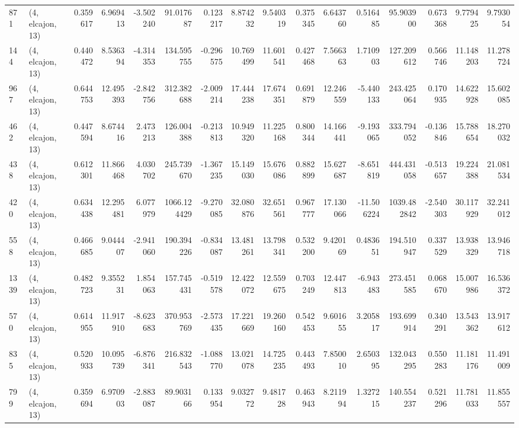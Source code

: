 \begin{tabular}{llrrrrrrrrrrrrrr}
871  &  (4, elcajon, 13) &   0.359617 &   6.969413 &  -3.502240 &     91.017687 &    0.123217 &    8.874232 &    9.540319 &  0.375345 &   6.643760 &   0.516485 &    95.903900 &   0.673368 &   9.779425 &   9.793054 \\
144  &  (4, elcajon, 13) &   0.440472 &   8.536394 &  -4.314353 &    134.595755 &   -0.296575 &   10.769499 &   11.601541 &  0.427468 &   7.566363 &   1.710903 &   127.209612 &   0.566746 &  11.148203 &  11.278724 \\
967  &  (4, elcajon, 13) &   0.644753 &  12.495393 &  -2.842756 &    312.382688 &   -2.009214 &   17.444238 &   17.674351 &  0.691879 &  12.246559 &  -5.440133 &   243.425064 &   0.170935 &  14.622928 &  15.602085 \\
462  &  (4, elcajon, 13) &   0.447594 &   8.674416 &   2.473213 &    126.004388 &   -0.213813 &   10.949320 &   11.225168 &  0.800344 &  14.166441 &  -9.193065 &   333.794052 &  -0.136846 &  15.788654 &  18.270032 \\
438  &  (4, elcajon, 13) &   0.612301 &  11.866468 &   4.030702 &    245.739670 &   -1.367235 &   15.149030 &   15.676086 &  0.882899 &  15.627687 &  -8.651819 &   444.431058 &  -0.513657 &  19.224388 &  21.081534 \\
420  &  (4, elcajon, 13) &   0.634438 &  12.295481 &   6.077979 &   1066.124429 &   -9.270085 &   32.080876 &   32.651561 &  0.967777 &  17.130066 & -11.506224 &  1039.482842 &  -2.540303 &  30.117929 &  32.241012 \\
558  &  (4, elcajon, 13) &   0.466685 &   9.044407 &  -2.941060 &    190.394226 &   -0.834087 &   13.481261 &   13.798341 &  0.532200 &   9.420169 &   0.483651 &   194.510947 &   0.337529 &  13.938329 &  13.946718 \\
1339 &  (4, elcajon, 13) &   0.482723 &   9.355231 &   1.854063 &    157.745431 &   -0.519578 &   12.422072 &   12.559675 &  0.703249 &  12.447813 &  -6.943483 &   273.451585 &   0.068670 &  15.007986 &  16.536372 \\
570  &  (4, elcajon, 13) &   0.614955 &  11.917910 &  -8.623683 &    370.953769 &   -2.573435 &   17.221669 &   19.260160 &  0.542453 &   9.601655 &   3.205817 &   193.699914 &   0.340291 &  13.543362 &  13.917612 \\
835  &  (4, elcajon, 13) &   0.520933 &  10.095739 &  -6.876341 &    216.832543 &   -1.088770 &   13.021078 &   14.725235 &  0.443493 &   7.850010 &   2.650395 &   132.043295 &   0.550283 &  11.181176 &  11.491009 \\
799  &  (4, elcajon, 13) &   0.359694 &   6.970903 &  -2.883087 &     89.903166 &    0.133954 &    9.032772 &    9.481728 &  0.463943 &   8.211994 &   1.327215 &   140.554237 &   0.521296 &  11.781033 &  11.855557 \\

\end{tabular}
